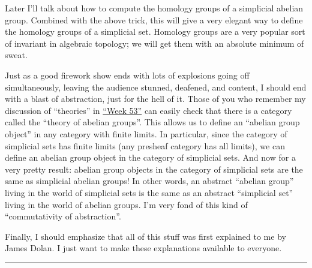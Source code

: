 \documentclass{article}
\begin{document}
Later I'll talk about how to compute the homology groups of a simplicial
abelian group. Combined with the above trick, this will give a very
elegant way to define the homology groups of a simplicial set. Homology
groups are a very popular sort of invariant in algebraic topology; we
will get them with an absolute minimum of sweat.

Just as a good firework show ends with lots of explosions going off
simultaneously, leaving the audience stunned, deafened, and content, I
should end with a blast of abstraction, just for the hell of it. Those
of you who remember my discussion of ``theories'' in
\protect\hyperlink{week53}{``Week 53''} can easily check that there is a
category called the ``theory of abelian groups''. This allows us to
define an ``abelian group object'' in any category with finite limits.
In particular, since the category of simplicial sets has finite limits
(any presheaf category has all limits), we can define an abelian group
object in the category of simplicial sets. And now for a very pretty
result: abelian group objects in the category of simplicial sets are the
same as simplicial abelian groups! In other words, an abstract ``abelian
group'' living in the world of simplicial sets is the same as an
abstract ``simplicial set'' living in the world of abelian groups. I'm
very fond of this kind of ``commutativity of abstraction''.

Finally, I should emphasize that all of this stuff was first explained
to me by James Dolan. I just want to make these explanations available
to everyone.

\begin{center}\rule{0.5\linewidth}{0.5pt}\end{center}
\end{document}
